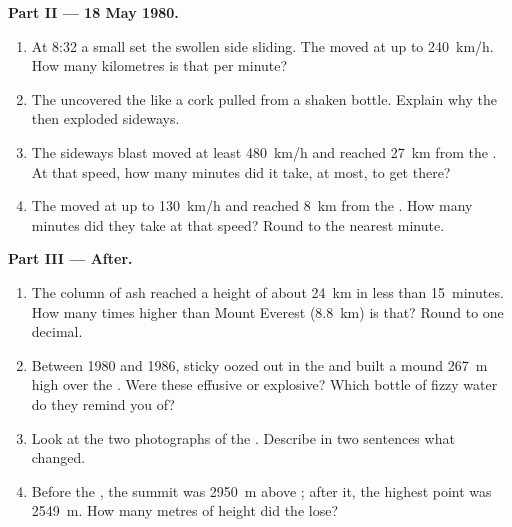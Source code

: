 \begin{problem}
\medskip
\noindent\textbf{Part II --- 18 May 1980.}\par\nopagebreak
\begin{enumerate}[resume, beginpenalty=10000]
  \item At 8:32 a small  set the swollen side sliding. The
         moved at up to \qty{240}{km/h}. How many kilometres is
        that per minute?
  \item The  uncovered the  like a cork pulled from a shaken
        bottle. Explain why the  then exploded sideways.
  \item The sideways blast moved at least \qty{480}{km/h} and reached
        \qty{27}{km} from the . At that speed, how many minutes did
        it take, at most, to get there?
  \item The  moved at up to \qty{130}{km/h} and reached
        \qty{8}{km} from the . How many minutes did they take at that
        speed? Round to the nearest minute.
\end{enumerate}

\medskip
\noindent\textbf{Part III --- After.}\par\nopagebreak
\begin{enumerate}[resume, beginpenalty=10000]
  \item The column of ash reached a height of about \qty{24}{km} in less
        than 15~minutes. How many times higher than Mount Everest
        (\qty{8.8}{km}) is that? Round to one decimal.
  \item Between 1980 and 1986, sticky  oozed out in the  and
        built a mound \qty{267}{m} high over the . Were these
         effusive or explosive? Which bottle of fizzy water do
        they remind you of?
  \item Look at the two photographs of the . Describe in two
        sentences what changed.
  \item Before the , the summit was \qty{2950}{m} above ;
        after it, the highest point was \qty{2549}{m}. How many metres of
        height did the  lose?
\end{enumerate}
\end{problem}
